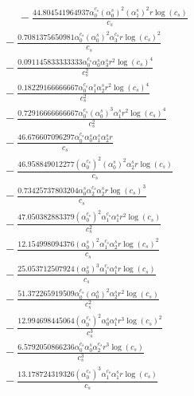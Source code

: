 \documentclass[10pt]{article}
\begin{document}
\begin{align*}
\phantom{R_{3,8}} &\phantom{={}}{}  - \frac{44.804541964937 \alpha_{0}^{c_s} \left(\alpha_{0}^s\right)^{2} \left(\alpha_{1}^s\right)^{2} r \log{\left(c_{s} \right)}}{c_{s}} \\
&{}  - \frac{0.7081375650981 \alpha_{0}^{c_s} \left(\alpha_{0}^s\right)^{2} \alpha_{3}^{c_s} r \log{\left(c_{s} \right)}^{2}}{c_{s}} \\
&{}  - \frac{0.091145833333333 \alpha_{0}^{c_s} \alpha_{0}^s \alpha_{3}^s r^{2} \log{\left(c_{s} \right)}^{4}}{c_{s}^{2}} \\
&{}  - \frac{0.18229166666667 \alpha_{0}^{c_s} \alpha_{1}^s \alpha_{2}^s r^{2} \log{\left(c_{s} \right)}^{4}}{c_{s}^{2}} \\
&{}  - \frac{0.72916666666667 \alpha_{0}^{c_s} \left(\alpha_{0}^s\right)^{3} \alpha_{1}^s r^{2} \log{\left(c_{s} \right)}^{4}}{c_{s}^{2}} \\
&{}  - \frac{46.676607096297 \alpha_{0}^{c_s} \alpha_{0}^s \alpha_{1}^s \alpha_{2}^s r}{c_{s}} \\
&{}  - \frac{46.958849012277 \left(\alpha_{0}^{c_s}\right)^{2} \left(\alpha_{0}^s\right)^{2} \alpha_{2}^s r \log{\left(c_{s} \right)}}{c_{s}} \\
&{}  - \frac{0.73425737803204 \alpha_{0}^s \alpha_{2}^{c_s} \alpha_{2}^s r \log{\left(c_{s} \right)}^{3}}{c_{s}} \\
&{}  - \frac{47.050382883379 \left(\alpha_{0}^{c_s}\right)^{2} \alpha_{1}^{c_s} \alpha_{1}^s r^{2} \log{\left(c_{s} \right)}}{c_{s}^{2}} \\
&{}  - \frac{12.154998094376 \left(\alpha_{0}^s\right)^{2} \alpha_{1}^{c_s} \alpha_{2}^s r \log{\left(c_{s} \right)}^{2}}{c_{s}} \\
&{}  - \frac{25.053712507924 \left(\alpha_{0}^s\right)^{3} \alpha_{1}^{c_s} \alpha_{1}^s r \log{\left(c_{s} \right)}}{c_{s}} \\
&{}  - \frac{51.372265919509 \alpha_{0}^{c_s} \left(\alpha_{0}^s\right)^{2} \alpha_{2}^s r^{2} \log{\left(c_{s} \right)}}{c_{s}^{2}} \\
&{}  - \frac{12.994698445064 \left(\alpha_{0}^{c_s}\right)^{2} \alpha_{0}^s \alpha_{1}^s r^{3} \log{\left(c_{s} \right)}^{2}}{c_{s}^{3}} \\
&{}  - \frac{6.5792050866236 \alpha_{0}^{c_s} \alpha_{0}^s \alpha_{2}^{c_s} r^{3} \log{\left(c_{s} \right)}}{c_{s}^{3}} \\
&{}  - \frac{13.178724319326 \left(\alpha_{0}^{c_s}\right)^{3} \alpha_{1}^{c_s} \alpha_{1}^s r \log{\left(c_{s} \right)}}{c_{s}} \\

\end{align*}
\end{document}
